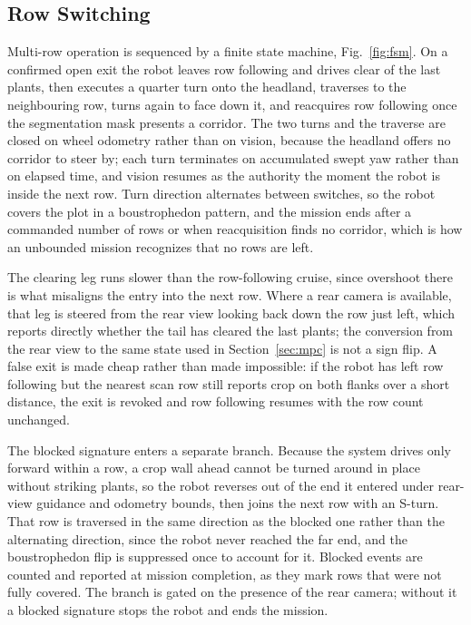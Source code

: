 \documentclass[conference]{IEEEtran}
\begin{document}
\subsection{Row Switching}
\label{sec:switching}
Multi-row operation is sequenced by a finite state machine,
Fig.~\ref{fig:fsm}. On a confirmed open exit the robot leaves row following and
drives clear of the last plants, then executes a quarter turn onto the headland,
traverses to the neighbouring row, turns again to face down it, and reacquires
row following once the segmentation mask presents a corridor. The two turns and
the traverse are closed on wheel odometry rather than on vision, because the
headland offers no corridor to steer by; each turn terminates on accumulated
swept yaw rather than on elapsed time, and vision resumes as the authority the
moment the robot is inside the next row. Turn direction alternates between
switches, so the robot covers the plot in a boustrophedon pattern, and the
mission ends after a commanded number of rows or when reacquisition finds no
corridor, which is how an unbounded mission recognizes that no rows are left.

The clearing leg runs slower than the row-following cruise, since overshoot
there is what misaligns the entry into the next row. Where a rear camera is
available, that leg is steered from the rear view looking back down the row just
left, which reports directly whether the tail has cleared the last plants; the
conversion from the rear view to the same state used in Section~\ref{sec:mpc} is
not a sign flip. A false exit is made cheap rather than made impossible: if the
robot has left row following but the nearest scan row still reports crop on both
flanks over a short distance, the exit is revoked and row following resumes with
the row count unchanged.

The blocked signature enters a separate branch. Because the system drives only
forward within a row, a crop wall ahead cannot be turned around in place without
striking plants, so the robot reverses out of the end it entered under rear-view
guidance and odometry bounds, then joins the next row with an S-turn. That row
is traversed in the same direction as the blocked one rather than the
alternating direction, since the robot never reached the far end, and the
boustrophedon flip is suppressed once to account for it. Blocked events are
counted and reported at mission completion, as they mark rows that were not
fully covered. The branch is gated on the presence of the rear camera; without
it a blocked signature stops the robot and ends the mission.
\end{document}
